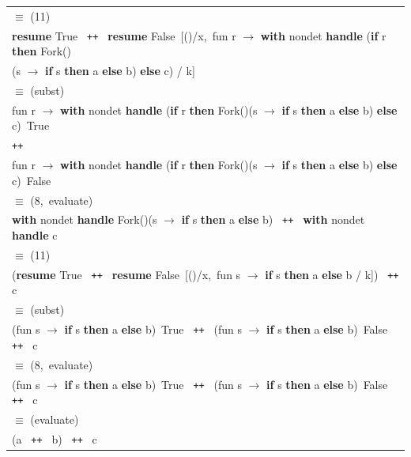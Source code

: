 \documentclass[logo,bsc,singlespacing,parskip]{infthesis}
\begin{document}
\begin{longtable}{@{}l@{}}
\hspace*{1em} $\equiv$ (11) \\[5pt]
\textbf{resume } True \texttt{ ++ } \textbf{resume } False\ [()/x,\ fun r $\rightarrow$ \textbf{with } nondet \textbf{ handle } (\textbf{if } r \textbf{ then } Fork() \\
\hspace*{3em} (s $\rightarrow$ \textbf{if } s \textbf{ then } a \textbf{ else } b) \textbf{ else } c) \;/\; k] \\[5pt]

\hspace*{1em} $\equiv$ (subst) \\[5pt]
fun r $\rightarrow$ \textbf{with } nondet \textbf{ handle } (\textbf{if } r \textbf{ then } Fork()(s $\rightarrow$ \textbf{if } s \textbf{ then } a \textbf{ else } b) \textbf{ else } c)\ True \\
\texttt{++} \\
fun r $\rightarrow$ \textbf{with } nondet \textbf{ handle } (\textbf{if } r \textbf{ then } Fork()(s $\rightarrow$ \textbf{if } s \textbf{ then } a \textbf{ else } b) \textbf{ else } c)\ False \\[5pt]

\hspace*{1em} $\equiv$ (8,\ evaluate) \\[5pt]
\textbf{with } nondet \textbf{ handle } Fork()(s $\rightarrow$ \textbf{if } s \textbf{ then } a \textbf{ else } b) \texttt{ ++ } \textbf{with } nondet \textbf{ handle } c \\[5pt]

\hspace*{1em} $\equiv$ (11) \\[5pt]
(\textbf{resume } True \texttt{ ++ } \textbf{resume } False\ [()/x,\ fun s $\rightarrow$ \textbf{if } s \textbf{ then } a \textbf{ else } b \;/\; k]) \texttt{ ++ } c \\[5pt]

\hspace*{1em} $\equiv$ (subst) \\[5pt]
(fun s $\rightarrow$ \textbf{if } s \textbf{ then } a \textbf{ else } b)\ True \texttt{ ++ } (fun s $\rightarrow$ \textbf{if } s \textbf{ then } a \textbf{ else } b)\ False \texttt{ ++ } c \\[5pt]

\hspace*{1em} $\equiv$ (8,\ evaluate) \\[5pt]
(fun s $\rightarrow$ \textbf{if } s \textbf{ then } a \textbf{ else } b)\ True \texttt{ ++ } (fun s $\rightarrow$ \textbf{if } s \textbf{ then } a \textbf{ else } b)\ False \texttt{ ++ } c \\[5pt]

\hspace*{1em} $\equiv$ (evaluate) \\[5pt]
(a \texttt{ ++ } b) \texttt{ ++ } c
\end{longtable}
\end{document}
